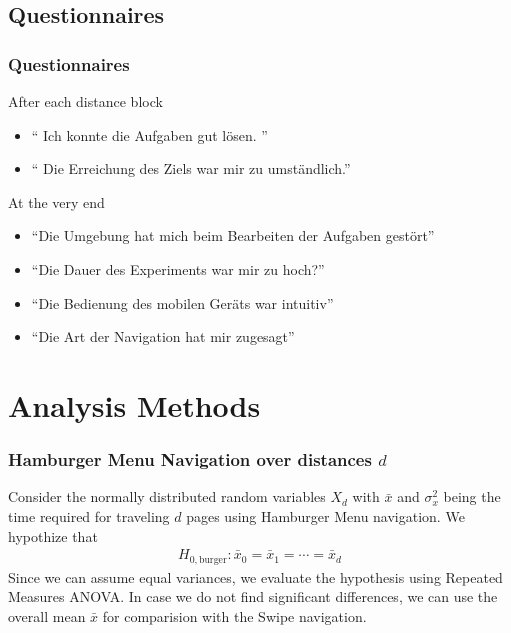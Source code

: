 \documentclass{beamer}
\begin{document}
\subsection{Questionnaires}
\begin{frame}
        \frametitle{Questionnaires}
        \begin{block}{After each distance block}
                \begin{itemize}
                        \item `` Ich konnte die Aufgaben gut lösen. ''
                        \item `` Die Erreichung des Ziels war mir zu umständlich.''
                \end{itemize}
        \end{block}
        \begin{block}{At the very end}
                \begin{itemize}
                        \item ``Die Umgebung hat mich beim Bearbeiten der Aufgaben gestört''
                        \item ``Die Dauer des Experiments war mir zu hoch?''
                        \item ``Die Bedienung des mobilen Geräts war intuitiv''
                        \item ``Die Art der Navigation hat mir zugesagt''
                \end{itemize}
        \end{block}
\end{frame}

\section{Analysis Methods}
\begin{frame}
        \frametitle{Hamburger Menu Navigation over distances $d$}
        Consider the normally distributed random variables $X_d$ with $\bar x$ and
        $\sigma_x^2$ being the time required for traveling $d$ pages using Hamburger
        Menu navigation.
        We hypothize that
        \begin{align*}
                H_{0, \text{burger}}: \bar x_0 = \bar x_1 = \cdots = \bar x_d
        \end{align*}
        Since we can assume equal variances,
        we evaluate the hypothesis using Repeated Measures {ANOVA}.
        In case we do not find significant differences, we can use the overall mean
        $\bar x$ for comparision with the Swipe navigation. 
\end{frame}
\end{document}
